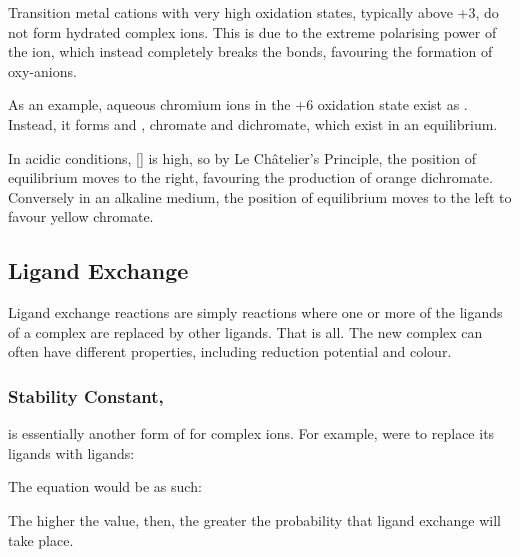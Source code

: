 				Transition metal cations with very high oxidation states, typically above +3, do not form hydrated complex ions. This is due
				to the extreme polarising power of the ion, which instead completely breaks the  bonds, favouring the formation of
				oxy-anions.

				As an example, aqueous chromium ions in the +6 oxidation state  exist as . Instead, it
				forms  and , chromate and dichromate, which exist in an equilibrium.


				In acidic conditions, [] is high, so by Le Châtelier's Principle, the position of equilibrium moves to the right,
				favouring the production of orange dichromate. Conversely in an alkaline medium, the position of equilibrium moves to the left
				to favour yellow chromate.




		\pagebreak
		\subsection{Ligand Exchange}

			Ligand exchange reactions are simply reactions where one or more of the ligands of a complex are replaced by other ligands. That
			is all. The new complex can often have different properties, including reduction potential and colour.

			\subsubsection{Stability Constant, }

				 is essentially another form of \Kc{} for complex ions. For example,  were to replace its  ligands
				with \ch{\Cl-} ligands:


				The  equation would be as such:


				The higher the  value, then, the greater the probability that ligand exchange will take place.

